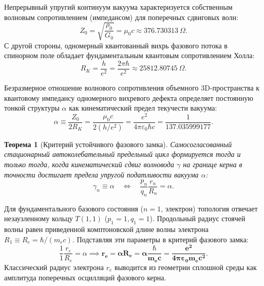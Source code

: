 \documentclass[12pt,a4paper]{article}
\newtheorem{theorem}{Теорема}
\begin{document}
	Непрерывный упругий континуум вакуума характеризуется собственным волновым сопротивлением (импедансом) для поперечных сдвиговых волн:
	\begin{equation}
		Z_0 = \sqrt{\frac{\rho_0}{G_0}} = \mu_0 c \approx 376.730313 \ \Omega.
	\end{equation}
	С другой стороны, одномерный квантованный вихрь фазового потока в спинорном поле обладает фундаментальным квантовым сопротивлением Холла:
	\begin{equation}
		R_K = \frac{h}{e^2} = \frac{2\pi \hbar}{e^2} \approx 25812.80745 \ \Omega.
	\end{equation}
	
	Безразмерное отношение волнового сопротивления объемного 3D-пространства к квантовому импедансу одномерного вихревого дефекта определяет постоянную тонкой структуры $\alpha$ как кинематический предел текучести вакуума:
	\begin{equation}
		\alpha \equiv \frac{Z_0}{2 R_K} = \frac{\mu_0 c}{2 (h/e^2)} = \frac{e^2}{4\pi \varepsilon_0 \hbar c} = \frac{1}{137.035999177}.
	\end{equation}
	
	\begin{theorem}[Критерий устойчивого фазового замка]
		Самосогласованный стационарный автоколебательный предельный цикл формируется тогда и только тогда, когда кинематический сдвиг волновода $\gamma$ на границе керна в точности достигает предела упругой податливости вакуума $\alpha$:
		\begin{equation}
			\gamma_n \equiv \alpha \quad \Longleftrightarrow \quad \frac{p_n}{q_n} \frac{r_n}{R_n} = \alpha.
		\end{equation}
	\end{theorem}
	
	Для фундаментального базового состояния ($n=1$, электрон) топология отвечает незаузленному кольцу $T(1,1)$ ($p_1 = 1, q_1 = 1$). Продольный радиус стоячей волны равен приведенной комптоновской длине волны электрона $R_1 \equiv R_e = \hbar / (m_e c)$. Подставляя эти параметры в критерий фазового замка:
	\begin{equation}
		\frac{1}{1} \frac{r_e}{R_e} = \alpha \implies \mathbf{r_e = \alpha R_e = \alpha \frac{\hbar}{m_e c} = \frac{e^2}{4\pi\varepsilon_0 m_e c^2}}.
	\end{equation}
	Классический радиус электрона $r_e$ выводится из геометрии сплошной среды как амплитуда поперечных осцилляций фазового керна.
	
\end{document}
